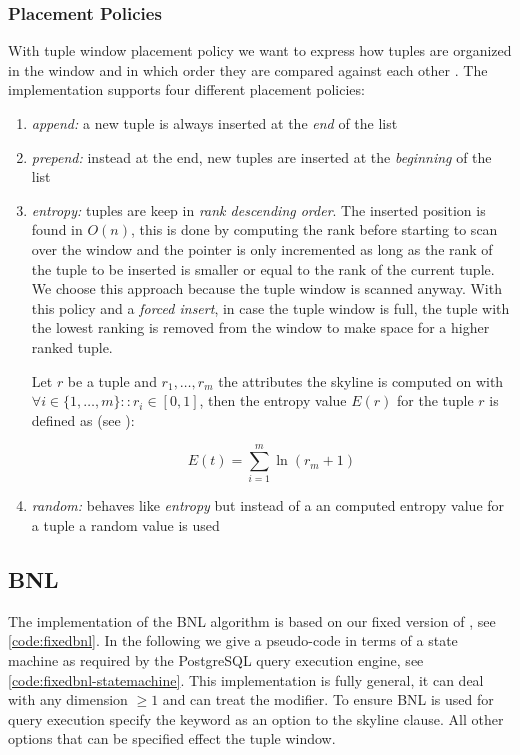 \subsubsection{Placement Policies}
\label{sec:tuplewindowpolicies}
With tuple window placement policy we want to express how tuples are
organized in the window and in which order they are compared against
each other \citep{Godfrey2007}. The implementation supports four
different placement policies:
\begin{enumerate}
\item \emph{append:} 
a new tuple is always inserted at the \emph{end} of the list

\item \emph{prepend:}
instead at the end, new tuples are inserted at the \emph{beginning} of
the list

\item \emph{entropy:}
tuples are keep in \emph{rank descending order}. The inserted position
is found in $O(n)$, this is done by computing the rank before starting
to scan over the window and the pointer is only incremented as long as
the rank of the tuple to be inserted is smaller or equal to the rank
of the current tuple. We choose this approach because the tuple window
is scanned anyway. With this policy and a \emph{forced insert}, in
case the tuple window is full, the tuple with the lowest ranking is
removed from the window to make space for a higher ranked tuple.

Let $r$ be a tuple and $r_1, \ldots, r_m$ the attributes the skyline
is computed on with $\forall i \in \{1, \ldots, m\}\colon: r_i \in [0,
1]$, then the entropy value $E(r)$ for the tuple $r$ is defined as
(see \citep{Chomicki2003,Chomicki2005}):

\begin{equation}\label{eqn:entropy}
E(t) = \sum_{i=1}^{m} \ln(r_m + 1)
\end{equation}

\item \emph{random: }
behaves like \emph{entropy} but instead of a an computed entropy value
for a tuple a random value is used

\end{enumerate}

\subsection{BNL}
The implementation of the BNL algorithm is based on our fixed version
of \citep{Borzsonyi2001}, see \autoref{code:fixedbnl}. In the
following we give a pseudo-code in terms of a state machine as
required by the PostgreSQL query execution engine, see
\autoref{code:fixedbnl-statemachine}. This implementation is fully general, it can deal with any dimension $\ge 1$ and can treat the  modifier. To ensure BNL is used for query execution specify the 
keyword as an option to the skyline clause.  All other options that
can be specified effect the tuple window.


